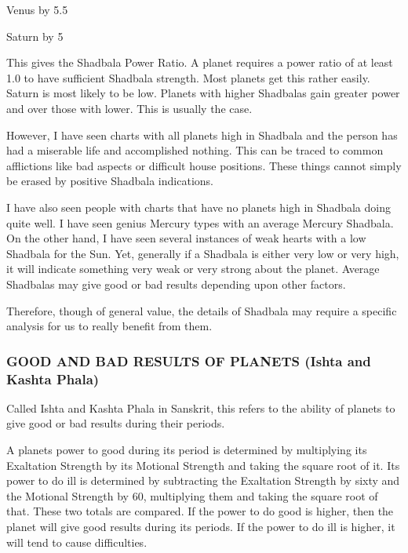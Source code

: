 Venus            by 5.5

Saturn            by 5

 

This gives the Shadbala Power Ratio. A planet requires a power ratio of at least 1.0 to have sufficient Shadbala strength. Most planets get this rather easily. Saturn is most likely to be low. Planets with higher Shadbalas gain greater power and over those with lower. This is usually the case.

 

However, I have seen charts with all planets high in Shadbala and the person has had a miserable life and accomplished nothing. This can be traced to common afflictions like bad aspects or difficult house positions. These things cannot simply be erased by positive Shadbala indications.

 

I have also seen people with charts that have no planets high in Shadbala doing quite well. I have seen genius Mercury types with an average Mercury Shadbala. On the other hand, I have seen several instances of weak hearts with a low Shadbala for the Sun. Yet, generally if a Shadbala is either very low or very high, it will indicate something very weak or very strong about the planet. Average Shadbalas may give good or bad results depending upon other factors.

 

Therefore, though of general value, the details of Shadbala may require a specific analysis for us to really benefit from them. 

 

\subsubsection{GOOD AND BAD RESULTS OF PLANETS (Ishta and Kashta Phala)}
 

Called Ishta and Kashta Phala in Sanskrit, this refers to the ability of planets to give good or bad results during their periods.

 

A planets power to good during its period is determined by multiplying its Exaltation Strength by its Motional Strength and taking the square root of it. Its power to do ill is determined by subtracting the Exaltation Strength by sixty and the Motional Strength by 60, multiplying them and taking the square root of that. These two totals are compared. If the power to do good is higher, then the planet will give good results during its periods. If the power to do ill is higher, it will tend to cause difficulties.

